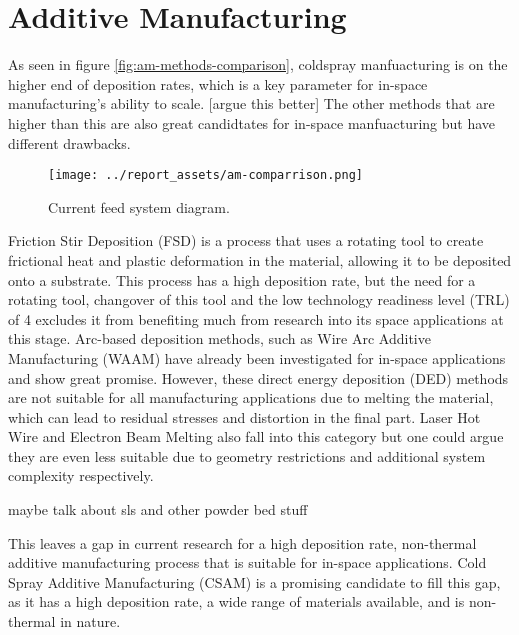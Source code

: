 \section{Additive Manufacturing}
As seen in figure \autoref{fig:am-methods-comparison}, coldspray manfuacturing is on the higher end of deposition rates, which is a key parameter for in-space manufacturing's ability to scale. [argue this better] The other methods that are higher than this are also great candidtates for in-space manfuacturing but have different drawbacks.
\begin{figure}[htbp]
    \centering

    \begin{minipage}{0.65\textwidth}
        \centering
        \texttt{[image: ../report\_assets/am-comparrison.png]}
        \caption{Current feed system diagram\cite{Ramoni2022}.}\label{fig:am-methods-comparison}
    \end{minipage}

\end{figure}

Friction Stir Deposition (FSD) is a process that uses a rotating tool to create frictional heat and plastic deformation in the material, allowing it to be deposited onto a substrate. This process has a high deposition rate, but the need for a rotating tool, changover of this tool and the low technology readiness level (TRL) of 4\cite{nasa2025fsd} excludes it from benefiting much from research into its space applications at this stage.
Arc-based deposition methods, such as Wire Arc Additive Manufacturing (WAAM) have already been investigated for in-space applications and show great promise. However, these direct energy deposition (DED) methods are not suitable for all manufacturing applications due to melting the material, which can lead to residual stresses and distortion in the final part\cite{PATTISON2007627}. Laser Hot Wire and Electron Beam Melting also fall into this category but one could argue they are even less suitable due to geometry restrictions and additional system complexity respectively.


maybe talk about sls and other powder bed stuff


This leaves a gap in current research for a high deposition rate, non-thermal additive manufacturing process that is suitable for in-space applications. Cold Spray Additive Manufacturing (CSAM) is a promising candidate to fill this gap, as it has a high deposition rate, a wide range of materials available, and is non-thermal in nature. 

